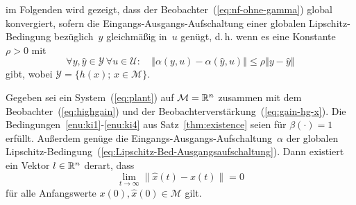 im Folgenden wird gezeigt, dass der Beobachter~(\ref{eq:nf-ohne-gamma})
global konvergiert, sofern die Eingangs-Ausgangs-Aufschaltung einer
globalen Lipschitz-Bedingung bezüglich~$y$
gleichmäßig in~$u$ genügt, d.\,h. wenn es eine Konstante $\rho>0$
mit 
\begin{equation}
\forall y,\hat{y}\in\mathcal{Y}\,\forall u\in\mathcal{U}:\quad\left\Vert \alpha(y,u)-\alpha(\hat{y},u)\right\Vert \leq\rho\left\Vert y-\hat{y}\right\Vert \label{eq:Lipschitz-Bed-Ausgangsaufschaltung}
\end{equation}
gibt, wobei $\mathcal{Y}=\{h(x);\,x\in\mathcal{M}\}$.
\begin{theorem}
\label{thm:high-gain} Gegeben sei ein System~(\ref{eq:plant}) auf
$\mathcal{M}={\mathbb{R}}^{n}$ zusammen mit dem Beobachter~(\ref{eq:highgain})
und der Beobachterverstärkung~(\ref{eq:gain-hg-x}). Die Bedingungen~\ref{enu:ki1}-\ref{enu:ki4}
aus Satz~\ref{thm:existence} seien für $\beta(\cdot)=1$ erfüllt.
Außerdem genüge die Eingangs-Ausgangs-Aufschaltung~$\alpha$ der
globalen Lipschitz-Bedingung~(\ref{eq:Lipschitz-Bed-Ausgangsaufschaltung}).
Dann existiert ein Vektor $l\in{\mathbb{R}}^{n}$ derart, dass 
\begin{equation}
\lim_{t\to\infty}\|\hat{x}(t)-x(t)\|=0\label{eq:nf-fehlerdgl-hg}
\end{equation}
 für alle Anfangswerte $x(0),\hat{x}(0)\in\mathcal{M}$ gilt. 
\end{theorem}

